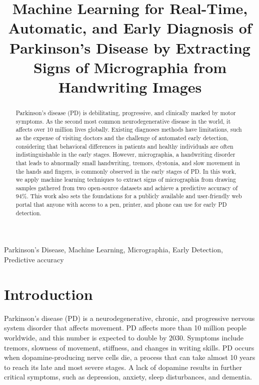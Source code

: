 \documentclass[pmlr,twocolumn,10pt]{jmlr} %
\title[Machine Learning for Diagnosis of Parkinson's Disease]{Machine Learning for Real-Time, Automatic, and Early Diagnosis of Parkinson’s Disease by Extracting Signs of Micrographia from Handwriting Images}
\begin{document}
\maketitle

\begin{abstract}
Parkinson’s disease (PD) is debilitating, progressive, and clinically marked by motor symptoms. As the second most common neurodegenerative disease in the world, it affects over 10 million lives globally. Existing diagnoses methods have limitations, such as the expense of visiting doctors and the challenge of automated early detection, considering that behavioral differences in patients and healthy individuals are often indistinguishable in the early stages. However, micrographia, a handwriting disorder that leads to abnormally small handwriting, tremors, dystonia, and slow movement in the hands and fingers, is commonly observed in the early stages of PD. In this work, we apply machine learning techniques to extract signs of micrographia from drawing samples gathered from two open-source datasets and achieve a predictive accuracy of 94\%. This work also sets the foundations for a publicly available and user-friendly web portal that anyone with access to a pen, printer, and phone can use for early PD detection.
\end{abstract}

\begin{keywords}
Parkinson’s Disease, Machine Learning, Micrographia, Early Detection, Predictive accuracy
\end{keywords}

\section{Introduction}
\label{sec:intro}

Parkinson’s disease (PD) is a neurodegenerative, chronic, and progressive nervous system disorder that affects movement. PD affects more than 10 million people worldwide, and this number is expected to double by 2030. \citep{choi2017refining} Symptoms include tremors, slowness of movement, stiffness, and changes in writing skills. PD occurs when dopamine-producing nerve cells die, a process that can take almost 10 years to reach its late and most severe stages. A lack of dopamine results in further critical symptoms, such as depression, anxiety, sleep disturbances, and dementia. 
\end{document}
